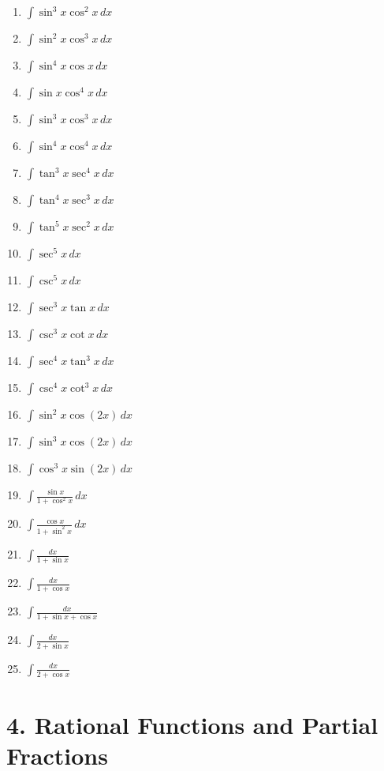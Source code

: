 \documentclass[11pt]{article}
\begin{document}
\begin{enumerate}
\item $\displaystyle \int \sin^3x\cos^2x\,dx$
\item $\displaystyle \int \sin^2x\cos^3x\,dx$
\item $\displaystyle \int \sin^4x\cos x\,dx$
\item $\displaystyle \int \sin x\cos^4x\,dx$
\item $\displaystyle \int \sin^3x\cos^3x\,dx$
\item $\displaystyle \int \sin^4x\cos^4x\,dx$
\item $\displaystyle \int \tan^3x\sec^4x\,dx$
\item $\displaystyle \int \tan^4x\sec^3x\,dx$
\item $\displaystyle \int \tan^5x\sec^2x\,dx$
\item $\displaystyle \int \sec^5x\,dx$
\item $\displaystyle \int \csc^5x\,dx$
\item $\displaystyle \int \sec^3x\tan x\,dx$
\item $\displaystyle \int \csc^3x\cot x\,dx$
\item $\displaystyle \int \sec^4x\tan^3x\,dx$
\item $\displaystyle \int \csc^4x\cot^3x\,dx$
\item $\displaystyle \int \sin^2x\cos(2x)\,dx$
\item $\displaystyle \int \sin^3x\cos(2x)\,dx$
\item $\displaystyle \int \cos^3x\sin(2x)\,dx$
\item $\displaystyle \int \frac{\sin x}{1+\cos^2x}\,dx$
\item $\displaystyle \int \frac{\cos x}{1+\sin^2x}\,dx$
\item $\displaystyle \int \frac{dx}{1+\sin x}$
\item $\displaystyle \int \frac{dx}{1+\cos x}$
\item $\displaystyle \int \frac{dx}{1+\sin x+\cos x}$
\item $\displaystyle \int \frac{dx}{2+\sin x}$
\item $\displaystyle \int \frac{dx}{2+\cos x}$
\end{enumerate}

\section*{4. Rational Functions and Partial Fractions}
\end{document}
